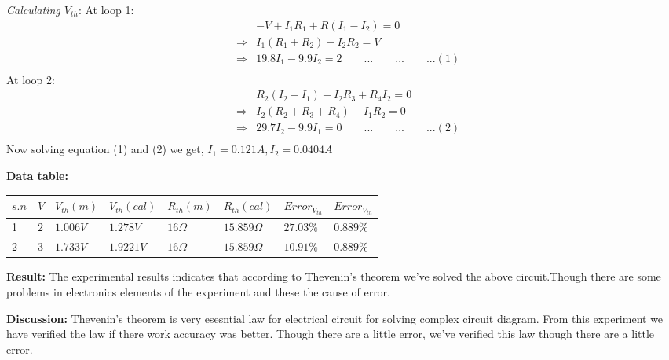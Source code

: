 \documentclass[12pt, a4paper]{article}
\begin{document}
\begin{flushleft}
	\qquad \textit{Calculating $V_{th}$}:
	At loop 1: 
	\begin{eqnarray*}
		&& -V + I_1R_1 + R(I_1 - I_2) = 0 \\
		&\Rightarrow& I_1(R_1 + R_2) - I_2R_2 = V \\
		&\Rightarrow& 19.8I_1 - 9.9I_2 = 2 \label{eqno} \qquad ... \qquad ... \qquad ... (1)\\
	\end{eqnarray*}
	At loop 2: 
	\begin{eqnarray*}
		&& R_2(I_2 - I_1) + I_2R_3 + R_4I_2 = 0\\
		&\Rightarrow& I_2(R_2 + R_3 + R_4) - I_1R_2 = 0 \\
		&\Rightarrow& 29.7I_2 - 9.9I_1 = 0 \qquad ... \qquad ... \qquad ... (2)\\
	\end{eqnarray*}
	Now solving equation (1) and (2) we get, $ I_1 = 0.121 A,  I_2 = 0.0404 A$ \\
	\qquad \qquad 
	\qquad \qquad 
\end{flushleft}

\begin{flushleft}
	\textbf{Data table:}\\
	\begin{center}
		\begin{tabular}{||l|l|l|l|l|l|l|l|} \hline
			$s.n$ & $V$ & $V_{th}(m)$ & $V_{th}(cal)$ & $R_{th}(m)$ & $R_{th}(cal)$ & $Error_{V_{th}}$ & $Error_{V_{th}}$\\ \hline 
		1 & $2$ & $1.006V$ & $1.278V $ & $16\Omega$ & $15.859\Omega$ & $27.03\%$ & $0.889\%$ \\ \hline
		2 & $3$ & $1.733V$ & $1.9221V$ & $16\Omega$ & $15.859\Omega$ & $10.91\%$ & $0.889\%$ \\ \hline
		\end{tabular}
	\end{center}
\end{flushleft}

\begin{flushleft}
	\textbf{Result:} The experimental results indicates that according to Thevenin's theorem we've solved the above circuit.Though there are some problems in electronics elements of the experiment and these the cause of error. \\
\end{flushleft}

\begin{flushleft}
	\textbf{Discussion:} Thevenin's theorem is very esesntial law for electrical circuit for solving complex circuit diagram. From this experiment we have verified the law if there work accuracy was better. Though there are a little error, we've verified this law though there are a little error. 
\end{flushleft}
\end{document}
